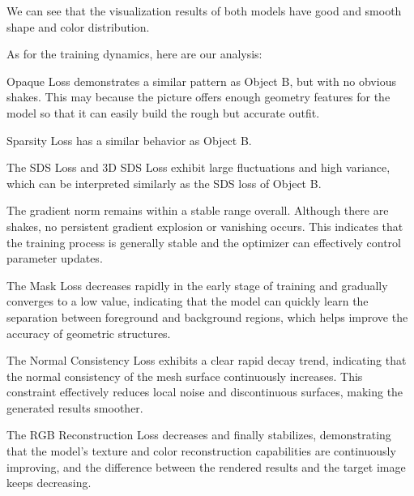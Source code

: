 We can see that the visualization results of both models have good and smooth shape and color distribution.

As for the training dynamics, here are our analysis:

Opaque Loss demonstrates a similar pattern as Object B, but with no obvious shakes. This may because the picture offers enough geometry features for the model so that it can easily build the rough but accurate outfit.

Sparsity Loss has a similar behavior as Object B.


The SDS Loss and 3D SDS Loss exhibit large fluctuations and high variance, which can be interpreted similarly as the SDS loss of Object B.

The gradient norm remains within a stable range overall. Although there are shakes, no persistent gradient explosion or vanishing occurs. This indicates that the training process is generally stable and the optimizer can effectively control parameter updates.

The Mask Loss decreases rapidly in the early stage of training and gradually converges to a low value, indicating that the model can quickly learn the separation between foreground and background regions, which helps improve the accuracy of geometric structures.

The Normal Consistency Loss exhibits a clear rapid decay trend, indicating that the normal consistency of the mesh surface continuously increases. This constraint effectively reduces local noise and discontinuous surfaces, making the generated results smoother.

The RGB Reconstruction Loss decreases and finally stabilizes, demonstrating that the model's texture and color reconstruction capabilities are continuously improving, and the difference between the rendered results and the target image keeps decreasing.

